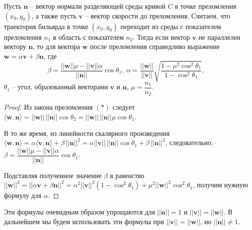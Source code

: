  \begin{statement}
Пусть $\mathbf{n}$ -- вектор нормали разделяющей среды кривой $C$ в точке преломления $(x_0, y_0)$, а также пусть $\mathbf{v}$ -- вектор скорости до преломления. Считаем, что траектория бильярда в точке $(x_0, y_0)$ переходит из среды с показателем преломления $n_1$ в область с показателем $n_2$. Тогда если вектор $\mathbf{v}$ не параллелен вектору $\mathbf{n}$, то для вектора   $\mathbf{w}$  после преломления справедливо выражение 
$\mathbf{w} = \alpha \mathbf{v} + \beta \mathbf{n}$, где 
$$\beta = \dfrac{||\mathbf{w}|| \mu - ||\mathbf{v}|| \alpha}{||\mathbf{n}||}\cos{\theta_1}, \ \alpha = \dfrac{||\mathbf{w}||}{||\mathbf{v}||}\sqrt{\dfrac{1-\mu^2\cos^2 \theta_1}{1-\cos^2 \theta_1 }},$$  $\theta_1$ -- угол, образованный векторами $\mathbf{v}$ и $\mathbf{n}$, $\mu = \dfrac{n_1}{n_2}$.
\label{st:alpha_beta_cosine_law}
\end{statement}
\begin{proof}
Из закона преломления $(\ast)$ следует 
$\langle\mathbf{w}, \mathbf{n}\rangle = ||\mathbf{w}||\, ||\mathbf{n}|| \cos \theta_2 = ||\mathbf{w}||\, ||\mathbf{n}|| \mu \cos \theta_1$.

В то же время, из линейности скалярного произведения
$\langle\mathbf{w}, \mathbf{n}\rangle = \alpha \langle\mathbf{v}, \mathbf{n}\rangle + \beta\, ||\mathbf{n}||^2 = \alpha ||\mathbf{v}||\, ||\mathbf{n}|| \cos \theta_1 + \beta\, ||\mathbf{n}||^2$, следовательно, $\beta = \dfrac{||\mathbf{w}|| \mu - ||\mathbf{v}|| \alpha}{||\mathbf{n}||}\cos{\theta_1}$. 

Подставляя полученное значение $\beta$ в равенство $||\mathbf{w}||^2 = ||\alpha \mathbf{v} + \beta \mathbf{n}||^2 = \alpha^2 ||\mathbf{v}||^2 (1-\cos^2 \theta_1) + \mu^2||\mathbf{w}||^2 \cos^2 \theta_1$, получим нужную формулу для  $\alpha$.
\end{proof}

\begin{remark}
    Эти формулы очевидным образом упрощаются для $||\mathbf{n}|| = 1$ и $||\mathbf{v}|| = ||\mathbf{w}||$. В дальнейшем мы будем использовать эти формулы при $||\mathbf{v}|| = ||\mathbf{w}||$, но $||\mathbf{n}|| \neq 1$.
\end{remark}

